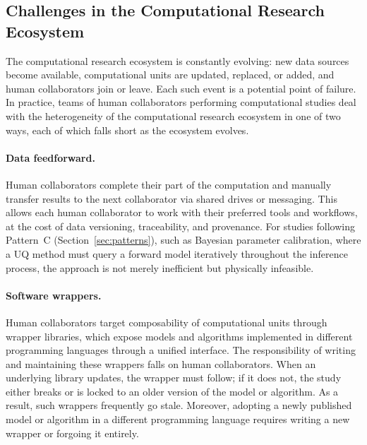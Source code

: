 \documentclass{eceasst}
\begin{document}
\subsection{Challenges in the Computational Research Ecosystem}
\label{sec:challenges}

The computational research ecosystem is constantly evolving: new data sources
become available, computational units are updated, replaced, or added, and
human collaborators join or leave. Each such event is a potential point of failure.
In practice, teams of human collaborators performing computational studies deal with
the heterogeneity of the computational research ecosystem in one of two ways,
each of which falls short as the ecosystem evolves.

\paragraph{Data feedforward.}
Human collaborators complete their part of the computation and manually transfer results
to the next collaborator via shared drives or messaging. This allows each human collaborator to work with their preferred tools and
workflows, at the cost of data versioning, traceability, and provenance.
For studies following Pattern~C (Section~\ref{sec:patterns}), such as Bayesian
parameter calibration, where a UQ method must query a forward model iteratively
throughout the inference process, the approach is not merely inefficient but
physically infeasible.

\paragraph{Software wrappers.}
Human collaborators target composability of computational units through wrapper
libraries, which expose models and algorithms implemented in different
programming languages through a unified interface. The responsibility of
writing and maintaining these wrappers falls on human collaborators. When an
underlying library updates, the wrapper must follow; if it does not, the study
either breaks or is locked to an older version of the model or algorithm. As a
result, such wrappers frequently go stale. Moreover, adopting a newly published
model or algorithm in a different programming language requires writing a new
wrapper or forgoing it entirely.
\end{document}
